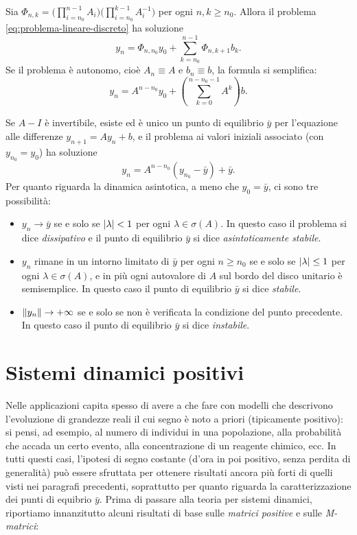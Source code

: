 \begin{teor}
Sia $\Phi_{n,k} = \bigl( \prod_{i=n_0}^{n-1} A_i \bigr)
\bigl( \prod_{i=n_0}^{k-1} A_i^{-1} \bigr)$ per ogni $n,k \geq n_0$.
Allora il problema \eqref{eq:problema-lineare-discreto} ha soluzione
\[
y_n = \Phi_{n,n_0} y_0 + \sum_{k=n_0}^{n-1} \Phi_{n,k+1} b_k.
\]
Se il problema è autonomo, cioè $A_n \equiv A$ e $b_n \equiv b$, la formula
si semplifica:
\[
y_n = A^{n-n_0} y_0 + \left( \sum_{k=0}^{n-n_0-1} A^k \right) b.
\]
\end{teor}

\begin{teor} \label{teor:dinamica-asintotica-lineare-discreto}
Se $A-I$ è invertibile, esiste ed è unico un punto di equilibrio $\bar{y}$ per
l'equazione alle differenze $y_{n+1} = A y_n + b$, e il problema ai valori
iniziali associato (con $y_{n_0} = y_0$) ha soluzione
\begin{equation} \label{eq:soluzione-problema-lineare-autonomo-AIinv-discreto}
y_n = A^{n-n_0} (y_{n_0} - \bar{y}) + \bar{y}.
\end{equation}
Per quanto riguarda la dinamica asintotica, a meno che $y_0 = \bar{y}$,
ci sono tre possibilità:
\begin{itemize}
\item $y_n \to \bar{y}$ se e solo se $\left\lvert\lambda\right\rvert < 1$ per ogni
	$\lambda \in \sigma(A)$. In questo caso il problema si dice \emph{dissipativo}
	e il punto di equilibrio $\bar{y}$ si dice \emph{asintoticamente stabile}.
\item $y_n$ rimane in un intorno limitato di $\bar{y}$ per ogni $n \geq n_0$
	se e solo se $\left\lvert\lambda\right\rvert \leq 1$ per ogni $\lambda \in \sigma(A)$,
	e in più ogni autovalore di $A$ sul bordo del disco unitario è semisemplice.
	In questo caso il punto di equilibrio $\bar{y}$ si dice \emph{stabile}.
\item $\left\lVert y_n\right\rVert \to +\infty$ se e solo se non è verificata la condizione
	del punto precedente. In questo caso il punto di equilibrio $\bar{y}$
	si dice \emph{instabile}.
\end{itemize}
\end{teor}

\section{Sistemi dinamici positivi}

Nelle applicazioni capita spesso di avere a che fare con modelli che descrivono
l'evoluzione di grandezze reali il cui segno è noto a priori (tipicamente positivo):
si pensi, ad esempio, al numero di individui in una popolazione, alla probabilità
che accada un certo evento, alla concentrazione di un reagente chimico, ecc.
In tutti questi casi, l'ipotesi di segno costante (d'ora in poi positivo,
senza perdita di generalità) può essere sfruttata per ottenere risultati
ancora più forti di quelli visti nei paragrafi precedenti, soprattutto per
quanto riguarda la caratterizzazione dei punti di equibrio $\bar{y}$.
Prima di passare alla teoria per sistemi dinamici, riportiamo innanzitutto
alcuni risultati di base sulle \emph{matrici positive} e sulle \emph{M-matrici}:

